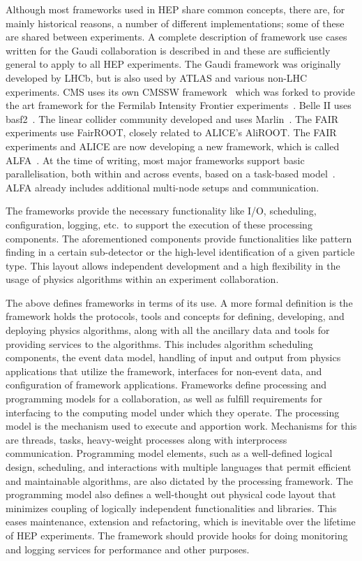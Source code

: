 \documentclass[12pt,a4paper]{article}
\begin{document}
Although most frameworks used in HEP share common concepts, there are,
for mainly historical reasons, a number of different implementations;
some of these are shared between experiments. A complete description
of framework use cases written for the Gaudi collaboration is
described in \cite{Maley:684466} and these are sufficiently general to apply
to all HEP experiments. The Gaudi framework \cite{Barrand:2001ny,1742-6596-219-4-042006} was originally
developed by LHCb, but is also used by ATLAS and various non-LHC
experiments. CMS uses its own CMSSW framework~\cite{Bayatian:2006nff}
which was forked to provide the art framework for the Fermilab
Intensity Frontier experiments~\cite{Green:2012gv}.  Belle II uses
basf2~\cite{1742-6596-331-3-032024}. The linear collider community
developed and uses Marlin~\cite{Gaede:2006pj}. The FAIR experiments
use FairROOT, closely related to ALICE's AliROOT. The FAIR experiments
and ALICE are now developing a new framework, which is called
ALFA~\cite{ALFA:ALICE-FAIR:2015}. At the time of writing, most major frameworks support
basic parallelisation, both within and across events, based on a
task-based model~\cite{Jones:2015soc,Clemencic:2015paa}. ALFA already
includes additional multi-node setups and communication.

The frameworks provide the necessary functionality like I/O,
scheduling, configuration, logging, etc.\ to support the execution of
these processing components. The aforementioned components provide
functionalities like pattern finding in a certain sub-detector or the
high-level identification of a given particle type. This layout allows
independent development and a high flexibility in the usage of physics
algorithms within an experiment collaboration.

The above defines frameworks in terms of its use. A more formal
definition is the framework holds the protocols, tools and concepts
for defining, developing, and deploying physics algorithms, along with
all the ancillary data and tools for providing services to the
algorithms.  This includes algorithm scheduling components, the event
data model, handling of input and output from physics applications
that utilize the framework, interfaces for non-event data, and
configuration of framework applications. Frameworks define processing
and programming models for a collaboration, as well as fulfill
requirements for interfacing to the computing model under which they
operate. The processing model is the mechanism used to execute and
apportion work. Mechanisms for this are threads, tasks, heavy-weight
processes along with interprocess communication. Programming model
elements, such as a well-defined logical design, scheduling, and
interactions with multiple languages that permit efficient and
maintainable algorithms, are also dictated by the processing
framework. The programming model also defines a well-thought out
physical code layout that minimizes coupling of logically independent
functionalities and libraries. This eases maintenance, extension and
refactoring, which is inevitable over the lifetime of HEP
experiments. The framework should provide hooks for doing monitoring
and logging services for performance and other purposes.
\end{document}

